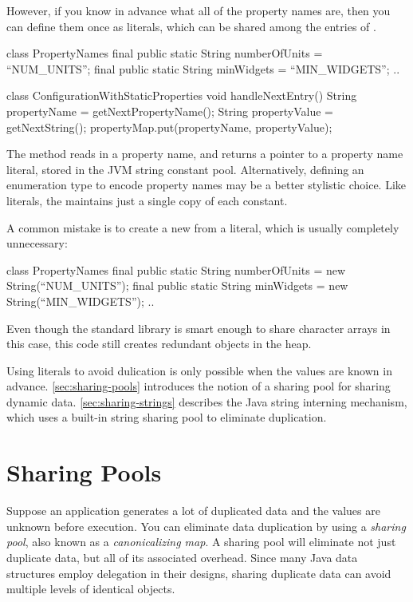 However, if you know in advance what all of the property names are, then you can
define them once as  literals, which can be shared among the
entries of .
\begin{shortlisting}
class PropertyNames {
	final public static String numberOfUnits = ``NUM_UNITS'';
	final public static String minWidgets = ``MIN_WIDGETS'';
	..
}

class ConfigurationWithStaticProperties {
    void handleNextEntry() {
       String propertyName = getNextPropertyName(); 
       String propertyValue = getNextString();
       propertyMap.put(propertyName, propertyValue);
    }
}
\end{shortlisting}
The  method reads in a property name, and returns
a pointer to a property name literal, stored in the JVM string
constant pool. Alternatively, defining an enumeration
type to encode property names may be a better stylistic choice.  Like
 literals, the \jre maintains just a single copy of each
 constant.

A common
 mistake is to create a new   from a  literal,
 which is usually completely unnecessary:
\begin{shortlisting}
class PropertyNames {
	final public static String numberOfUnits = 
	                           new String(``NUM_UNITS'');
	final public static String minWidgets = 
	                           new String(``MIN_WIDGETS'');
	..
}
\end{shortlisting}
Even though the standard library is smart enough to share
character arrays in this case, this code still creates redundant 
objects in the heap.

Using  literals to avoid dulication is only possible when the
 values are known in advance. 
\autoref{sec:sharing-pools} introduces the notion of a sharing pool for
sharing dynamic data. \autoref{sec:sharing-strings} describes the Java
string interning mechanism, which uses a built-in string sharing pool to
eliminate duplication.

\section{Sharing Pools}
\label{sec:sharing-pools}

Suppose an application generates a lot of duplicated data and the values
are unknown before execution. 
You can eliminate data duplication by using a \emph{sharing pool}, also known
as a \emph{canonicalizing map}. 
A sharing pool will eliminate not just duplicate data, 
but all of its associated overhead. Since many Java data structures employ 
delegation in their designs, sharing duplicate data can avoid
multiple levels of identical objects.

